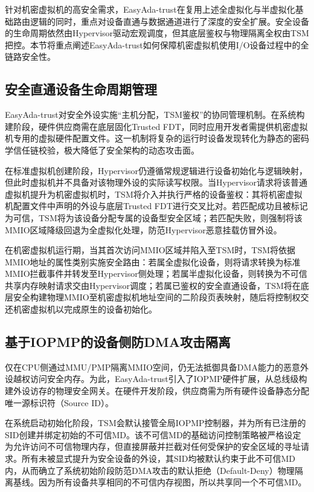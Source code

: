 \documentclass[master, vlined, review]{DissertUESTC}
\begin{document}
	针对机密虚拟机的高安全需求，EasyAda-trust在复用上述全虚拟化与半虚拟化基础路由逻辑的同时，重点对设备直通与数据通道进行了深度的安全扩展。安全设备的生命周期依然由Hypervisor驱动宏观调度，但其底层鉴权与物理隔离全权由TSM把控。本节将重点阐述EasyAda-trust如何保障机密虚拟机使用I/O设备过程中的全链路安全性。

	\subsection{安全直通设备生命周期管理}
	EasyAda-trust对安全外设实施“主机分配，TSM鉴权”的协同管理机制。在系统构建阶段，硬件供应商需在底层固化Trusted FDT，同时应用开发者需提供机密虚拟机专用的虚拟硬件配置文件。这一机制将复杂的运行时设备发现转化为静态的密码学信任链校验，极大降低了安全架构的动态攻击面。
	
	在标准虚拟机创建阶段，Hypervisor仍遵循常规逻辑进行设备初始化与逻辑映射，但此时虚拟机并不具备对该物理外设的实际读写权限。当Hypervisor请求将该普通虚拟机提升为机密虚拟机时，TSM将介入并执行严格的设备鉴权：其将机密虚拟机配置文件中声明的外设与底层Trusted FDT进行交叉比对。若匹配成功且被标记为可信，TSM将为该设备分配专属的设备型安全区域；若匹配失败，则强制将该MMIO区域降级回退为全虚拟化处理，防范Hypervisor恶意挂载仿冒外设。
	
	在机密虚拟机运行期，当其首次访问MMIO区域并陷入至TSM时，TSM将依据MMIO地址的属性类别实施安全路由：若属全虚拟化设备，则将请求转换为标准MMIO拦截事件并转发至Hypervisor侧处理；若属半虚拟化设备，则转换为不可信共享内存映射请求交由Hypervisor调度；若属已鉴权的安全直通设备，TSM将在底层安全构建物理MMIO至机密虚拟机地址空间的二阶段页表映射，随后将控制权交还机密虚拟机以完成原生的设备初始化。

	\subsection{基于IOPMP的设备侧防DMA攻击隔离}
	仅在CPU侧通过MMU/PMP隔离MMIO空间，仍无法抵御具备DMA能力的恶意外设越权访问安全内存。为此，EasyAda-trust引入了IOPMP硬件扩展，从总线级构建外设访存的物理安全网关。在硬件开发阶段，供应商需为所有硬件设备静态分配唯一源标识符（Source ID）。
	
	在系统启动初始化阶段，TSM会默认接管全局IOPMP控制器，并为所有已注册的SID创建并绑定初始的不可信MD。该不可信MD的基础访问控制策略被严格设定为允许访问不可信物理内存，但直接屏蔽并拦截对任何受保护的安全区域的寻址请求。所有未被显式提升为安全设备的外设，其SID均被默认约束于此不可信MD内，从而确立了系统初始阶段防范DMA攻击的默认拒绝（Default-Deny）物理隔离基线。因为所有设备共享相同的不可信内存视图，所以共享同一个不可信MD。
	
\end{document}
